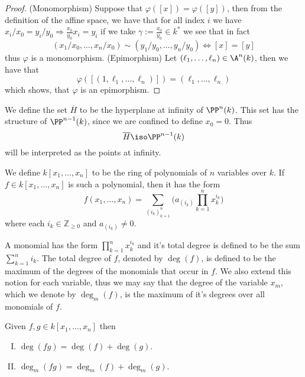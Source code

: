 \begin{proof}
    (Monomorphism) Suppose that \(\varphi([x]) = \varphi([y])\), then from the
    definition of the affine space, we have that for all index \(i\) we have
    \(x_i/x_0 = y_i/y_0 \Rightarrow \frac{x_0}{y_0}x_i = y_i\) if we take
    \(\gamma := \frac{x_0}{y_0} \in k^\ast\) we see that in fact
    \[
        (x_1/x_0,\dots,x_n/x_0) \sim (y_1/y_0,\dots,y_n/y_0) \Leftrightarrow [x]
        = [y]
    \]
    thus \(\varphi\) is a monomorphism.
    (Epimorphism) Let \((\ell_1, \dots, \ell_n) \in \A^n(k)\), then we have that
    \[\varphi\left(\left[(1, \ell_1, \dots, \ell_n)\right]\right) =
        (\ell_1,\dots,\ell_n)\] which shows, that  \(\varphi\) is an epimorphism.
\end{proof}

\begin{definition}[Hyperplane]
    We define the set \(\overline{H}\) to be the hyperplane at infinity of
    \(\PP^n(k)\). This set has the structure of \(\PP^{n-1}(k)\), since we are
    confined to define \(x_0 = 0\). Thus
    \[
        \overline{H} \iso \PP^{n-1}(k)
    \]
    will be interpreted as the points at infinity.
\end{definition}

\begin{definition}
    We define \(k[x_1, \dots, x_n]\) to be the ring of polynomials of \(n\)
    variables over \(k\). If  \(f \in k[x_1, \dots, x_n]\) is such a polynomial,
    then it has the form
    \[
        f(x_1, \dots, x_n) = \sum_{(i_k)_{k=1}^n} \bigg(a_{(i_k)} \prod_{k = 1}^n
        x_k^{i_k}\bigg)
    \]
    where each \(i_k \in \mathbb{Z}_{\geqslant 0}\) and \(a_{(i_k)} \neq 0\).

    A monomial has the form \(\prod_{k=1}^n x_k^{i_k}\) and it's total degree is
    defined to be the sum \(\sum_{k=1}^n i_k\). The total degree of \(f\),
    denoted by \(\deg(f)\), is defined to be the maximum of the degrees of the
    monomials that occur in \(f\). We also extend this notion for each variable,
    thus we may say that the degree of the variable \(x_m\), which we denote by
    \(\deg_m(f)\), is the maximum of it's degrees over all monomials of \(f\).
\end{definition}

\begin{corollary}
    Given \(f, g \in k[x_1, \dots, x_n]\) then
    \begin{enumerate}[I.]
        \item \(\deg(fg) = \deg(f) + \deg(g)\).
        \item  \(\deg_m(fg) = \deg_m(f) + \deg_m(g)\).
    \end{enumerate}
\end{corollary}

